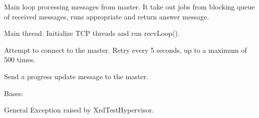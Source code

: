 \documentclass[a4paper,11pt,openany]{sphinxmanual}
\begin{document}
\begin{fulllineitems}
\begin{fulllineitems}
\end{fulllineitems}


\begin{fulllineitems}
\label{ref-manual/XrdTestHypervisor:XrdTestHypervisor.XrdTestHypervisor.recvLoop}
Main loop processing messages from master. It take out jobs
from blocking queue of received messages, runs appropriate and
return answer message.

\end{fulllineitems}


\begin{fulllineitems}
\label{ref-manual/XrdTestHypervisor:XrdTestHypervisor.XrdTestHypervisor.run}
Main thread. Initialize TCP threads and run recvLoop().

\end{fulllineitems}


\begin{fulllineitems}
\label{ref-manual/XrdTestHypervisor:XrdTestHypervisor.XrdTestHypervisor.tryConnect}
Attempt to connect to the master. Retry every 5 seconds, up to a 
maximum of 500 times.

\end{fulllineitems}


\begin{fulllineitems}
\label{ref-manual/XrdTestHypervisor:XrdTestHypervisor.XrdTestHypervisor.updateState}
Send a progress update message to the master.

\end{fulllineitems}


\end{fulllineitems}


\begin{fulllineitems}
\label{ref-manual/XrdTestHypervisor:XrdTestHypervisor.XrdTestHypervisorException}
Bases: 

General Exception raised by XrdTestHypervisor.

\end{fulllineitems}
\end{document}
